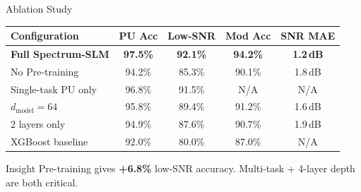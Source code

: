 \documentclass[aspectratio=169, 10pt]{beamer}
\begin{document}
\begin{frame}{Ablation Study}
\small
\begin{center}
\renewcommand{\arraystretch}{1.35}
\begin{tabular}{@{}l cccc @{}}
\toprule
\textbf{Configuration} & \textbf{PU Acc} & \textbf{Low-SNR} & \textbf{Mod Acc} & \textbf{SNR MAE} \\
\midrule
\rowcolor{teal!8}
\textbf{Full Spectrum-SLM} & \textbf{97.5\%} & \textbf{92.1\%} & \textbf{94.2\%} & \textbf{1.2\,dB} \\
No Pre-training       & 94.2\% & 85.3\% & 90.1\% & 1.8\,dB \\
\rowcolor{lightbg}
Single-task PU only   & 96.8\% & 91.5\% & N/A    & N/A \\
$d_\text{model}=64$   & 95.8\% & 89.4\% & 91.2\% & 1.6\,dB \\
\rowcolor{lightbg}
2 layers only         & 94.9\% & 87.6\% & 90.7\% & 1.9\,dB \\
XGBoost baseline      & 92.0\% & 80.0\% & 87.0\% & N/A \\
\bottomrule
\end{tabular}
\end{center}
\begin{exampleblock}{Insight}
\footnotesize
Pre-training gives \textbf{+6.8\%} low-SNR accuracy. Multi-task + 4-layer depth are both critical.
\end{exampleblock}
\end{frame}


\end{document}
